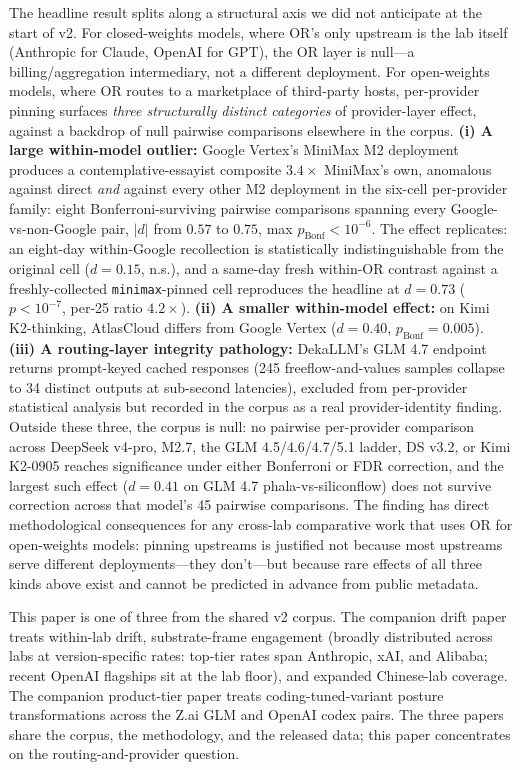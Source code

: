 \documentclass[11pt,a4paper]{article}
\begin{document}
The headline result splits along a structural axis we did not anticipate at the start of v2. For closed-weights models, where OR's only upstream is the lab itself (Anthropic for Claude, OpenAI for GPT), the OR layer is null---a billing/aggregation intermediary, not a different deployment. For open-weights models, where OR routes to a marketplace of third-party hosts, per-provider pinning surfaces \emph{three structurally distinct categories} of provider-layer effect, against a backdrop of null pairwise comparisons elsewhere in the corpus. \textbf{(i) A large within-model outlier:} Google Vertex's MiniMax M2 deployment produces a contemplative-essayist composite $3.4\times$ MiniMax's own, anomalous against direct \emph{and} against every other M2 deployment in the six-cell per-provider family: eight Bonferroni-surviving pairwise comparisons spanning every Google-vs-non-Google pair, $|d|$ from $0.57$ to $0.75$, max $p_\text{Bonf}{<}10^{-6}$. The effect replicates: an eight-day within-Google recollection is statistically indistinguishable from the original cell ($d{=}0.15$, n.s.), and a same-day fresh within-OR contrast against a freshly-collected \texttt{minimax}-pinned cell reproduces the headline at $d{=}0.73$ ($p<10^{-7}$, per-25 ratio $4.2\times$). \textbf{(ii) A smaller within-model effect:} on Kimi K2-thinking, AtlasCloud differs from Google Vertex ($d{=}0.40$, $p_\text{Bonf}{=}0.005$). \textbf{(iii) A routing-layer integrity pathology:} DekaLLM's GLM 4.7 endpoint returns prompt-keyed cached responses (245 freeflow-and-values samples collapse to 34 distinct outputs at sub-second latencies), excluded from per-provider statistical analysis but recorded in the corpus as a real provider-identity finding. Outside these three, the corpus is null: no pairwise per-provider comparison across DeepSeek v4-pro, M2.7, the GLM 4.5/4.6/4.7/5.1 ladder, DS v3.2, or Kimi K2-0905 reaches significance under either Bonferroni or FDR correction, and the largest such effect ($d{=}0.41$ on GLM 4.7 phala-vs-siliconflow) does not survive correction across that model's 45 pairwise comparisons. The finding has direct methodological consequences for any cross-lab comparative work that uses OR for open-weights models: pinning upstreams is justified not because most upstreams serve different deployments---they don't---but because rare effects of all three kinds above exist and cannot be predicted in advance from public metadata.

This paper is one of three from the shared v2 corpus. The companion drift paper \citep{tenner2026drift} treats within-lab drift, substrate-frame engagement (broadly distributed across labs at version-specific rates: top-tier rates span Anthropic, xAI, and Alibaba; recent OpenAI flagships sit at the lab floor), and expanded Chinese-lab coverage. The companion product-tier paper \citep{tenner2026producttier} treats coding-tuned-variant posture transformations across the Z.ai GLM and OpenAI codex pairs. The three papers share the corpus, the methodology, and the released data; this paper concentrates on the routing-and-provider question.
\end{document}
